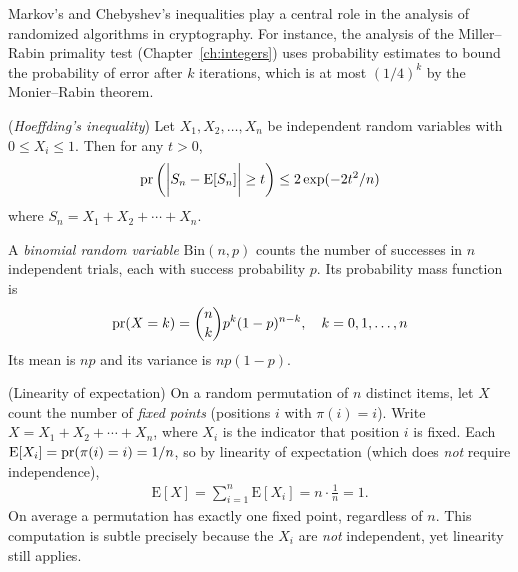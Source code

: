 \documentclass[a4paper, 12pt]{book} %
\begin{document}
\begin{remark}
    Markov's and Chebyshev's inequalities play a central role in the analysis of randomized algorithms in cryptography. For instance, the analysis of the Miller--Rabin primality test (Chapter~\ref{ch:integers}) uses probability estimates to bound the probability of error after $k$ iterations, which is at most $(1/4)^k$ by the Monier--Rabin theorem.
\end{remark}

\begin{theorem}
    (\emph{Hoeffding's inequality}) Let $X_1, X_2, \ldots, X_n$ be independent random variables with $0 \leq X_i \leq 1$. Then for any $t > 0$,
    \begin{align}
        \operatorname{pr}\bigg( \bigg| S_n - \mathrm{E}[S_n] \bigg| \geq t \bigg) \leq 2\exp(-2t^2/n)
    \end{align}
    where $S_n = X_1 + X_2 + \cdots + X_n$.
\end{theorem}

\begin{definition}
    A \emph{binomial random variable} $\mathrm{Bin}(n, p)$ counts the number of successes in $n$ independent trials, each with success probability $p$. Its probability mass function is
    \begin{align}
        \operatorname{pr}(X = k) = \binom{n}{k} p^k (1-p)^{n-k}, \quad k = 0, 1, \ldots, n
    \end{align}
    Its mean is $np$ and its variance is $np(1-p)$.
\end{definition}

\begin{example}
    (Linearity of expectation) On a random permutation of $n$ distinct items, let $X$ count the number of \emph{fixed points} (positions $i$ with $\pi(i) = i$). Write $X = X_1 + X_2 + \cdots + X_n$, where $X_i$ is the indicator that position $i$ is fixed. Each $\mathrm{E}[X_i] = \operatorname{pr}(\pi(i) = i) = 1/n$, so by linearity of expectation (which does \emph{not} require independence),
    \begin{align}
        \mathrm{E}[X] = \sum_{i=1}^n \mathrm{E}[X_i] = n \cdot \frac1n = 1.
    \end{align}
    On average a permutation has exactly one fixed point, regardless of $n$. This computation is subtle precisely because the $X_i$ are \emph{not} independent, yet linearity still applies.
\end{example}
\end{document}
